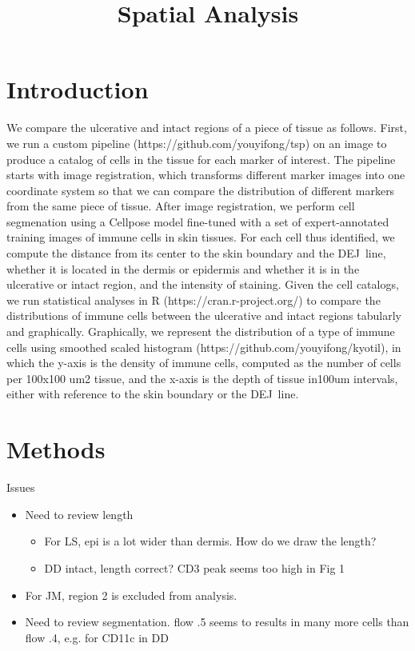 \documentclass{article}
\begin{document}
\title{Spatial Analysis}
\author{}
\maketitle

\section{Introduction}

We compare the ulcerative and intact regions of a piece of tissue as
follows. First, we run a custom pipeline (https://github.com/youyifong/tsp)
on an image to produce a catalog of cells in the tissue for each marker of
interest. The pipeline starts with image registration, which transforms
different marker images into one coordinate system so that we can compare
the distribution of different markers from the same piece of tissue. After
image registration, we perform cell segmenation using a Cellpose model
fine-tuned with a set of expert-annotated training images of immune cells in
skin tissues. For each cell thus identified, we compute the distance from
its center to the skin boundary and the DEJ\ line, whether it is located in
the dermis or epidermis and whether it is in the ulcerative or intact
region, and the intensity of staining. Given the cell catalogs, we run
statistical analyses in R (https://cran.r-project.org/) to compare the
distributions of immune cells between the ulcerative and intact regions
tabularly and graphically. Graphically, we represent the distribution of a
type of immune cells using smoothed scaled histogram
(https://github.com/youyifong/kyotil), in which the y-axis is the density of
immune cells, computed as the number of cells per 100x100 um2 tissue, and
the x-axis is the depth of tissue in100um intervals, either with reference
to the skin boundary or the DEJ\ line. 

\bigskip

\section{Methods}

\bigskip Issues

\begin{itemize}
\item Need to review length

\begin{itemize}
\item For LS, epi is a lot wider than dermis. How do we draw the length?

\item DD intact, length correct? CD3 peak seems too high in Fig 1
\end{itemize}

\item For JM, region 2 is excluded from analysis.

\item Need to review segmentation. flow .5 seems to results in many more
cells than flow .4, e.g. for CD11c in DD
\end{itemize}
\end{document}
